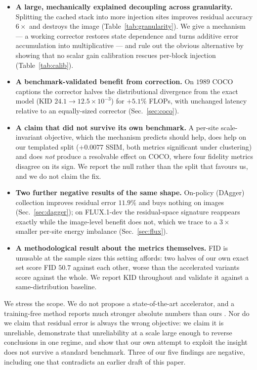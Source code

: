 \documentclass[10pt,twocolumn,letterpaper]{article}
\begin{document}
\begin{itemize}\itemsep2pt
\item \textbf{A large, mechanically explained decoupling across granularity.} Splitting
the cached stack into more injection sites improves residual accuracy $6\times$ and
destroys the image (Table~\ref{tab:granularity}). We give a mechanism --- a working
corrector restores state dependence and turns additive error accumulation into
multiplicative --- and rule out the obvious alternative by showing that no scalar gain
calibration rescues per-block injection (Table~\ref{tab:calib}).

\item \textbf{A benchmark-validated benefit from correction.} On $1989$ COCO captions
the corrector halves the distributional divergence from the exact model
(KID $24.1 \to 12.5 \times 10^{-3}$) for $+5.1\%$ FLOPs, with unchanged latency
relative to an equally-sized corrector (Sec.~\ref{sec:coco}).

\item \textbf{A claim that did not survive its own benchmark.} A per-site
scale-invariant objective, which the mechanism predicts should help, does help on our
templated split ($+0.0077$ SSIM, both metrics significant under clustering) and does
\emph{not} produce a resolvable effect on COCO, where four fidelity metrics disagree on
its sign. We report the null rather than the split that favours us, and we do not claim
the fix.

\item \textbf{Two further negative results of the same shape.} On-policy (DAgger)
collection improves residual error $11.9\%$ and buys nothing on images
(Sec.~\ref{sec:dagger}); on FLUX.1-dev the residual-space signature reappears exactly
while the image-level benefit does not, which we trace to a $3\times$ smaller per-site
energy imbalance (Sec.~\ref{sec:flux}).

\item \textbf{A methodological result about the metrics themselves.} FID is unusable at
the sample sizes this setting affords: two halves of our own exact set score FID $50.7$
against each other, worse than the accelerated variants score against the whole. We
report KID throughout and validate it against a same-distribution baseline.
\end{itemize}

We stress the scope. We do not propose a state-of-the-art accelerator, and a
training-free method reports much stronger absolute numbers than ours
\cite{liu2025taylorseer}. Nor do we claim that residual error is always the wrong
objective: we claim it is unreliable, demonstrate that unreliability at a scale large
enough to reverse conclusions in one regime, and show that our own attempt to exploit
the insight does not survive a standard benchmark. Three of our five findings are
negative, including one that contradicts an earlier draft of this paper.
\end{document}
